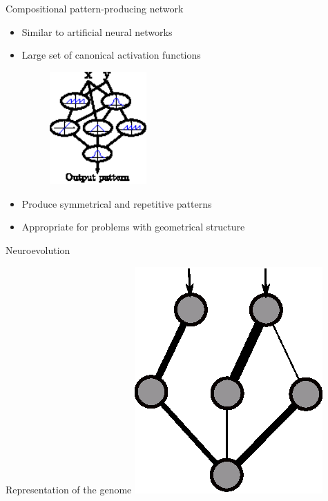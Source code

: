 \documentclass[6pt]{beamer}
\begin{document}
\begin{frame}{Compositional pattern-producing network~}
\begin{itemize}
\item Similar to artificial neural networks
\item Large set of canonical activation functions
\begin{figure}
\begin{center}
\includegraphics[width=0.35\textwidth]{../Figures/Misc/cppnNetwork.eps}
\end{center}
\end{figure}
\item Produce symmetrical and repetitive patterns
\item Appropriate for problems with geometrical structure
\end{itemize}
\end{frame}

\begin{frame}{Neuroevolution}
\begin{block}{Representation of the genome}
\centering
\includegraphics[height=0.7\textheight]{../Figures/Misc/networksMutationWeights1.eps}
\end{block}
\end{frame}
\end{document}
